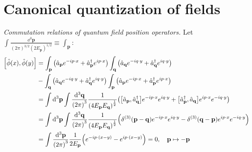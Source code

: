 \documentclass{report}
\begin{document}
\chapter{Canonical quantization of fields}

\begin{subquests}
	\item \emph{Commutation relations of quantum field position operators.} Let $\displaystyle \int \frac{\dd^3{\mathbf p}}{(2\pi)^{3/2} (2E_{\mathbf p})^{1/2}} \equiv \displaystyle \int_{\mathbf p}$:
	\begin{align*}
		\bqty{\hat{\phi}(x),\hat{\phi}(y)} & = \int_{\mathbf p} \pqty{\hat{a}_{\vb p}e^{-i p \cdot x} + \hat{a}^{\dagger}_{\vb p}e^{i p \cdot x}} \int _{\mathbf q}\pqty{\hat{a}_{\vb q}e^{-i q \cdot y} + \hat{a}^{\dagger}_{\vb q}e^{i q \cdot y}} \\
		& - \int_{\mathbf q}\pqty{\hat{a}_{\vb q}e^{-i q \cdot y} + \hat{a}^{\dagger}_{\vb q}e^{i q \cdot y}} \int_{\mathbf p} \pqty{\hat{a}_{\vb p}e^{-i p \cdot x} + \hat{a}^{\dagger}_{\vb p}e^{i p \cdot x}} \\
		& = \int \dd^3{\vb p}\int \frac{\dd^3{\vb q}}{\pqty{2\pi}^3}\frac{1}{\pqty{4E_{\vb p}E_{\vb q}}^{\frac{1}{2}}}\pqty{\bqty{\hat{a}_{\vb p},\hat{a}^{\dagger}_{\vb q}}e^{-i p \cdot x}e^{i q \cdot y} + \bqty{\hat{a}^{\dagger}_{\vb p},\hat{a}_{\vb q}}e^{i p \cdot x}e^{-i q \cdot y}} \\
		& = \int \dd^3{\vb p}\int \frac{\dd^3{\vb q}}{\pqty{2\pi}^3}\frac{1}{\pqty{4E_{\vb p}E_{\vb q}}^{\frac{1}{2}}}\pqty{\delta^{(3)}\pqty{\vb p - \vb q}e^{-i p \cdot x}e^{i q \cdot y} - \delta^{(3)}\pqty{\vb q - \vb p}e^{i p \cdot x}e^{-i q \cdot y}} \\
		& = \int\frac{\dd^3{\vb p}}{\pqty{2\pi}^3}\frac{1}{2E_{\vb p}}\pqty{e^{-i p\cdot (x - y)} - e^{i p \cdot(x - y)}} = 0, \quad \vb p \mapsto -\vb p
	\end{align*}


\end{subquests}
\end{document}
